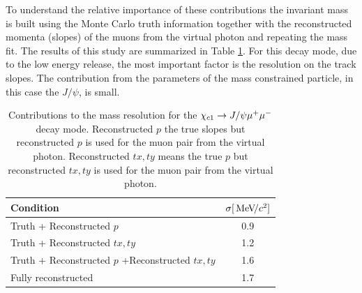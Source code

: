 To understand the relative importance of these contributions the
invariant mass is built using the Monte Carlo truth information together with  the
reconstructed momenta (slopes) of the
muons from the virtual photon and repeating the mass fit. The results
of this study are summarized in Table \ref{tab:rescontrib}. For this
decay mode, due to the low energy release, the most
important factor is the resolution on the track slopes. The contribution from the parameters of the mass constrained
particle, in this case the $J/\psi$, is small.
%
\begin{table}[htb!]
\caption{\small Contributions to the mass resolution for the ${\chi_{{c} 1}}
  \rightarrow J/\psi  \mu^+ \mu^- $ decay mode. Reconstructed $p$
  the true slopes but reconstructed $p$ is used for the muon pair from
  the virtual photon. Reconstructed $tx,ty$ means the true $p$ but reconstructed $tx,ty$ is used for the muon pair from
  the virtual photon.  }
\begin{center}
\small
\begin{tabular}{l|c}
Condition & $\sigma [\text{\,Me\kern -0.1em V\!/}c^2]$   \\
\hline
Truth + Reconstructed $p$ & 0.9  \\
Truth + Reconstructed $tx,ty$ & 1.2\\
Truth + Reconstructed $p$ +Reconstructed $tx,ty$ & 1.6 \\  
Fully reconstructed & 1.7 \\
\end{tabular}
\end{center}
\label{tab:rescontrib}
\end{table}

